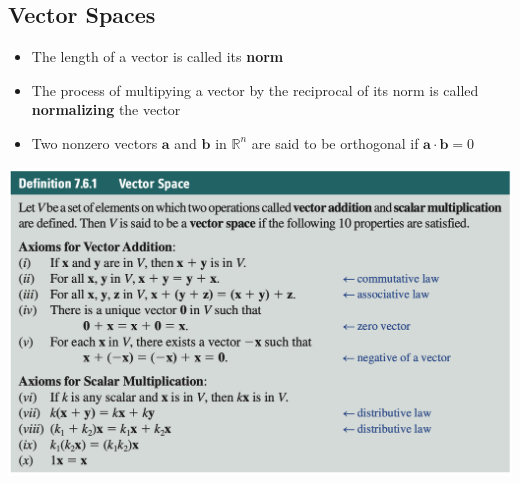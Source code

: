 \documentclass{article}
\begin{document}
\subsection{Vector Spaces}

\begin{itemize}
  \item The length of a vector is called its \textbf{norm}

  \item The process of multipying a vector by the reciprocal of its norm is called \textbf{normalizing} the vector

  \item Two nonzero vectors $\mathbf{a}$ and $\mathbf{b}$ in $\mathbb{R}^n$ are said to be orthogonal if $\mathbf{a} \cdot \mathbf{b} = 0$
\end{itemize}

\includegraphics[scale=0.443]{vector-space}
\end{document}
